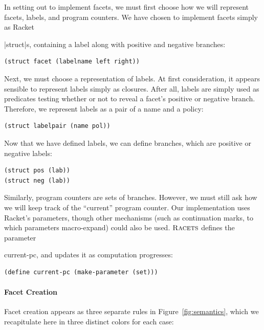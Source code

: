 \documentclass[review=true,acmlarge]{acmart}
\newcommand*{\SavedLstInline}{}
\DeclareRobustCommand*{\lstinline}{%
  \ifmmode
    \let\SavedBGroup\bgroup
    \def\bgroup{%
      \let\bgroup\SavedBGroup
      \hbox\bgroup
    }%
  \fi
  \SavedLstInline
}
\newcommand{\code}[1]{\lstinline{#1}}
\newcommand{\comm}[3][\color{red}]{{#1{[{#2}: {#3}]}}}
\newcommand{\kris}[1]{\comm[\color{blue}]{Kris}{#1}}
\newcommand{\racets}[0]{$\textsc{Racets}$\xspace}
\begin{document}
In setting out to implement facets, we must first choose how we will
represent facets, labels, and program counters. We have chosen to
implement facets simply as Racket \lstinline|struct|s, containing a
label along with positive and negative branches:

\begin{lstlisting}[language=Racket,escapechar=|,name=racets]
(struct facet (labelname left right))
\end{lstlisting}

Next, we must choose a representation of labels. At first
consideration, it appears sensible to represent labels simply as
closures. After all, labels are simply used as predicates testing
whether or not to reveal a facet's positive or negative
branch. Therefore, we represent labels as a pair of a name and a policy:

\begin{lstlisting}[language=Racket,escapechar=|,name=racets]
(struct labelpair (name pol))
\end{lstlisting}

Now that we have defined labels, we can define branches, which are
positive or negative labels:

\begin{lstlisting}[language=Racket,escapechar=|,name=racets]
(struct pos (lab))
(struct neg (lab))
\end{lstlisting}

Similarly, program counters are sets of branches. However, we must
still ask how we will keep track of the ``current'' program
counter. Our implementation uses Racket's parameters, though other
mechanisms (such as continuation marks\kris{cite}, to which parameters
macro-expand) could also be used. \racets defines the parameter
\code{current-pc}, and updates it as computation progresses:

\begin{lstlisting}[language=Racket,escapechar=|,name=racets]
(define current-pc (make-parameter (set)))
\end{lstlisting}

\paragraph*{Facet Creation}

Facet creation appears as three separate rules in
Figure~\ref{fig:semantics}, which we recapitulate here in three
distinct colors for each case:
\end{document}
